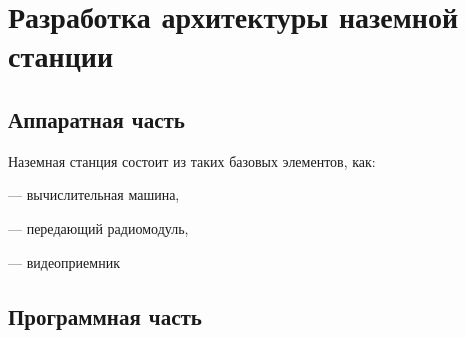 
\section{Разработка архитектуры наземной станции}
\subsection{Аппаратная часть}
Наземная станция состоит из таких базовых элементов, как:

--- вычислительная машина,

--- передающий радиомодуль,

--- видеоприемник

\subsection{Программная часть}
